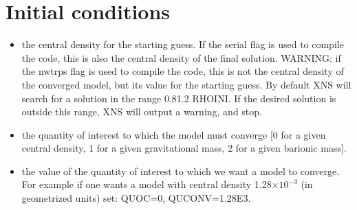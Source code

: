 \documentclass[letterpaper,10pt,english]{sphinxmanual}
\begin{document}
\section{Initial conditions}
\label{\detokenize{user_params:initial-conditions}}\begin{itemize}
\item {} 
\sphinxAtStartPar
{} \sphinxhyphen{} the central density for the starting guess. If the serial flag is used to compile the code, this is also the central density of the final solution. WARNING: if the nwtrps flag is used to compile the code, this is not the central density of the converged model, but its value for the starting guess. By default XNS will search for a solution in the range 0.8\sphinxhyphen{}1.2 RHOINI. If the desired solution is outside this range, XNS will output a warning, and stop.


\item {} 
\sphinxAtStartPar
{} \sphinxhyphen{} the quantity of interest to which the model must converge {[}0 for a given central density, 1 for
a given gravitational mass, 2 for a given barionic mass{]}.


\item {} 
\sphinxAtStartPar
{} \sphinxhyphen{} the value of the quantity of interest to which we want a model to converge. For example if one wants a model with central density 1.28\(\times 10^{−3}\) (in geometrized units) set: QUOC=0, QUCONV=1.28E\sphinxhyphen{}3.

\end{itemize}
\end{document}
